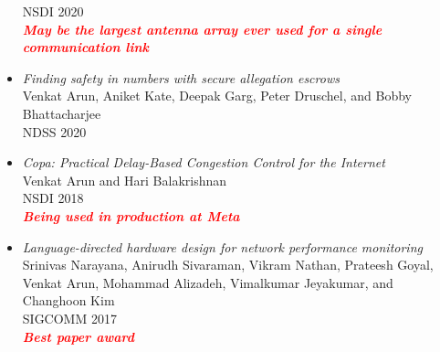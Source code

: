 \documentclass[notitlepage]{article}
\newcommand{\highlight}[1]{\textcolor{red}{\textit{\textbf{#1}}}}
\begin{document}
\begin{itemize}[noitemsep,nolistsep]
      NSDI 2020\\
              \highlight{May be the largest antenna array ever used for a single communication link}\\
              \item {\it Finding safety in numbers with secure allegation escrows}\label{paper:sae}\\
      Venkat Arun, Aniket Kate, Deepak Garg, Peter Druschel, and Bobby Bhattacharjee\\
      NDSS 2020\\
              \item {\it Copa: Practical Delay-Based Congestion Control for the Internet}\label{paper:copa}\\
      Venkat Arun and Hari Balakrishnan\\
      NSDI 2018\\
              \highlight{Being used in production at Meta}\\
              \item {\it Language-directed hardware design for network performance monitoring}\label{paper:marple}\\
      Srinivas Narayana, Anirudh Sivaraman, Vikram Nathan, Prateesh Goyal, Venkat Arun, Mohammad Alizadeh, Vimalkumar Jeyakumar, and Changhoon Kim\\
      SIGCOMM 2017\\
              \highlight{Best paper award}\\
        \end{itemize}
\end{document}
